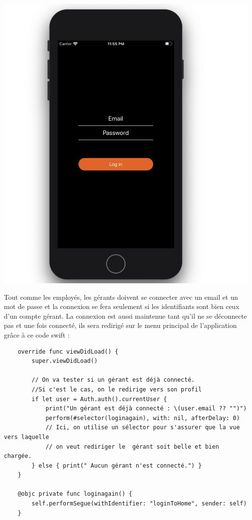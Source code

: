\documentclass{article}
\begin{document}
\begin{center}
    \includegraphics[scale=0.15]{coIOS.png}
\end{center}

Tout comme les employés, les gérants doivent se connecter avec un email et un mot de passe et la connexion se fera seulement si les identifiants sont bien ceux d'un compte gérant. La connexion est aussi maintenue tant qu'il ne se  déconnecte pas et une fois connecté, ils sera redirigé sur le menu principal de l'application grâce à ce code swift :

\begin{verbatim}
    override func viewDidLoad() {
        super.viewDidLoad()
        
        // On va tester si un gérant est déjà connecté. 
        //Si c'est le cas, on le redirige vers son profil
        if let user = Auth.auth().currentUser {
            print("Un gérant est déjà connecté : \(user.email ?? "")")
            perform(#selector(loginagain), with: nil, afterDelay: 0)
            // Ici, on utilise un sélector pour s'assurer que la vue vers laquelle
            // on veut rediriger le  gérant soit belle et bien chargée.
        } else { print(" Aucun gérant n'est connecté.") }
    }
    
    @objc private func loginagain() {
        self.performSegue(withIdentifier: "loginToHome", sender: self)
    }
\end{verbatim}
\end{document}
